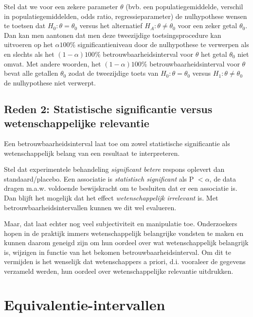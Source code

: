 \documentclass[
  dutch,
  letterpaper,
  12pt]{book}
\theoremstyle{definition}
\theoremstyle{definition}
\theoremstyle{definition}
\theoremstyle{remark}
\begin{document}
Stel dat we voor een zekere parameter \(\theta\) (bvb. een
populatiegemiddelde, verschil in populatiegemiddelden, odds ratio,
regressieparameter) de nulhypothese wensen te toetsen dat
\(H_0 : \theta=
\theta_0\) versus het alternatief \(H_A : \theta \neq \theta_0\) voor
een zeker getal \(\theta_0\). Dan kan men aantonen dat men deze
tweezijdige toetsingsprocedure kan uitvoeren op het \(\alpha 100\%\)
significantieniveau door de nulhypothese te verwerpen als en slechts als
het \((1-\alpha)100\%\) betrouwbaarheidsinterval voor \(\theta\) het
getal \(\theta_0\) niet omvat. Met andere woorden, het
\((1-\alpha)100\%\) betrouwbaarheidsinterval voor \(\theta\) bevat alle
getallen \(\theta_0\) zodat de tweezijdige toets van \(H_0 : \theta=
\theta_0\) versus \(H_1 : \theta \neq \theta_0\) de nulhypothese niet
verwerpt.

\subsection{Reden 2: Statistische significantie versus wetenschappelijke
relevantie}\label{reden-2-statistische-significantie-versus-wetenschappelijke-relevantie}

Een betrouwbaarheidsinterval laat toe om zowel statistische
significantie als wetenschappelijk belang van een resultaat te
interpreteren.

Stel dat experimentele behandeling \emph{significant betere} respons
oplevert dan standaard/placebo. Een associatie is \emph{statistisch
significant} als P \(< \alpha\), de data dragen m.a.w. voldoende
bewijskracht om te besluiten dat er een associatie is. Dan blijft het
mogelijk dat het effect \emph{wetenschappelijk irrelevant} is. Met
betrouwbaarheidsintervallen kunnen we dit wel evalueren.

Maar, dat laat echter nog veel subjectiviteit en manipulatie toe.
Onderzoekers hopen in de praktijk immers wetenschappelijk belangrijke
vondsten te maken en kunnen daarom geneigd zijn om hun oordeel over wat
wetenschappelijk belangrijk is, wijzigen in functie van het bekomen
betrouwbaarheidsinterval. Om dit te vermijden is het wenselijk dat
wetenschappers a priori, d.i. vooraleer de gegevens verzameld werden,
hun oordeel over wetenschappelijke relevantie uitdrukken.

\section{Equivalentie-intervallen}\label{equivalentie-intervallen}
\end{document}
